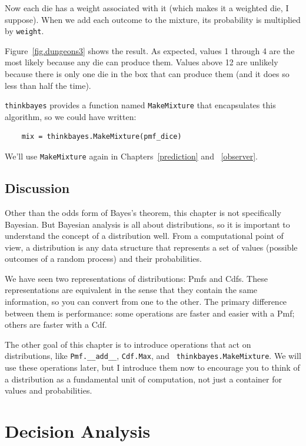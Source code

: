 \documentclass[12pt]{book}
\begin{document}
Now each die has a weight associated with it (which makes it a
weighted die, I suppose).  When we add each outcome to the mixture,
its probability is multiplied by {\tt weight}.

Figure~\ref{fig.dungeons3} shows the result.  As expected, values 1
through 4 are the most likely because any die can produce them.
Values above 12 are unlikely because there is only one die in the box
that can produce them (and it does so less than half the time).

{\tt thinkbayes} provides a function named {\tt MakeMixture}
that encapsulates this algorithm, so we could have written:

\begin{verbatim}
    mix = thinkbayes.MakeMixture(pmf_dice)
\end{verbatim}

We'll use {\tt MakeMixture} again in Chapters~\ref{prediction} and
~\ref{observer}.


\section{Discussion}

Other than the odds form of Bayes's theorem, this chapter is not
specifically Bayesian.  But Bayesian analysis is all about
distributions, so it is important to understand the concept of a
distribution well.  From a computational point of view, a distribution
is any data structure that represents a set of values (possible
outcomes of a random process) and their probabilities.

We have seen two representations of distributions: Pmfs and Cdfs.
These representations are equivalent in the sense that they contain
the same information, so you can convert from one to the other.  The
primary difference between them is performance: some operations are
faster and easier with a Pmf; others are faster with a Cdf.
 

The other goal of this chapter is to introduce operations that act on
distributions, like \verb"Pmf.__add__", {\tt Cdf.Max}, and {\tt
  thinkbayes.MakeMixture}.  We will use these operations later, but I
introduce them now to encourage you to think of a distribution as a
fundamental unit of computation, not just a container for values and
probabilities.



\chapter{Decision Analysis}
\label{decisionanalysis}
\end{document}
